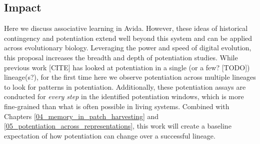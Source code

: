 \subsection{Impact}
Here we discuss associative learning in Avida. 
However, these ideas of historical contingency and potentiation extend well beyond this system and can be applied across evolutionary biology. 
Leveraging the power and speed of digital evolution, this proposal increases the breadth and depth of potentiation studies. 
While previous work [CITE] has looked at potentiation in a single (or a few? [TODO]) lineage(s?), for the first time here we observe potentiation across multiple lineages to look for patterns in potentiation. 
Additionally, these potentiation assays are conducted for \textit{every step} in the identified potentiation windows, which is more fine-grained than what is often possible in living systems. 
Combined with Chapters \ref{04_memory_in_patch_harvesting} and \ref{05_potentiation_across_representations}, this work will create a baseline expectation of how potentiation can change over a successful lineage. 
